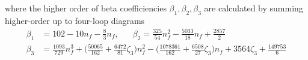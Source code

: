 where the higher order of beta coefficiencies  $\beta_1,\beta_2,\beta_3$ are calculated by summing higher-order up to four-loop diagrams
\begin{equation*}
\begin{split}
\beta_1 &= 102 - 10 n_f - \frac{8}{3} n_f  , \;\;\;\;\;\;
\beta_2 = \frac{325}{54}n_f^2 - \frac{5033}{18}n_f   +\frac{2857}{2} \\
\beta_3  &= \frac{1093}{729}n_f^3  + \big ( \frac{50065}{162}+\frac{6472}{81}\zeta_3 \big ) n_f^2   -  \big ( \frac{1078361}{162}+\frac{6508}{27}\zeta_3 \big ) n_f + 3564\zeta_3+\frac{149753}{6}
\end{split}
\end{equation*}

